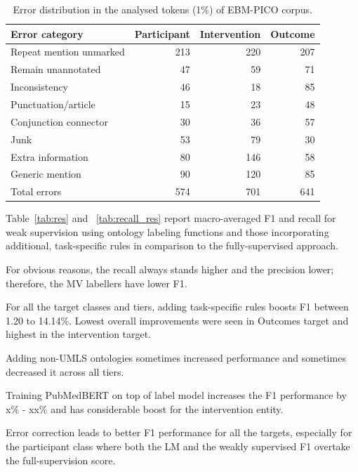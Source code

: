 \documentclass[10.7pt,]{article}
\begin{document}
\begin{table}[!ht]
    \centering
    \begin{tabular}{|l|r|r|r|}
    \hline
        Error category & Participant & Intervention & Outcome \\ \hline
        Repeat mention unmarked & 213 & 220 & 207 \\ 
        Remain unannotated & 47 & 59 & 71 \\ 
        Inconsistency & 46 & 18 & 85 \\ 
        Punctuation/article & 15 & 23 & 48 \\ 
        Conjunction connector & 30 & 36 & 57 \\ 
        Junk & 53 & 79 & 30 \\ 
        Extra information & 80 & 146 & 58 \\ 
        Generic mention & 90 & 120 & 85 \\ \hline
        Total errors & 574 & 701 & 641 \\ \hline
    \end{tabular}
    \caption{\label{tab:errordist} Error distribution in the analysed tokens (1\%) of EBM-PICO corpus.}
\end{table}

%


Table~\ref{tab:res} and ~\ref{tab:recall_res} report macro-averaged F1 and recall for weak supervision using ontology labeling functions and those incorporating additional, task-specific rules in comparison to the fully-supervised approach.


For obvious reasons, the recall always stands higher and the precision lower; therefore, the MV labellers have lower F1.


For all the target classes and tiers, adding task-specific rules boosts F1 between 1.20 to 14.14\%.
Lowest overall improvements were seen in Outcomes target and highest in the intervention target.


Adding non-UMLS ontologies sometimes increased performance and sometimes decreased it across all tiers.


Training PubMedBERT on top of label model increases the F1 performance by x\% - xx\% and has considerable boost for the intervention entity.


Error correction leads to better F1 performance for all the targets, especially for the participant class where both the LM and the weakly supervised F1 overtake the full-supervision score.
\end{document}
